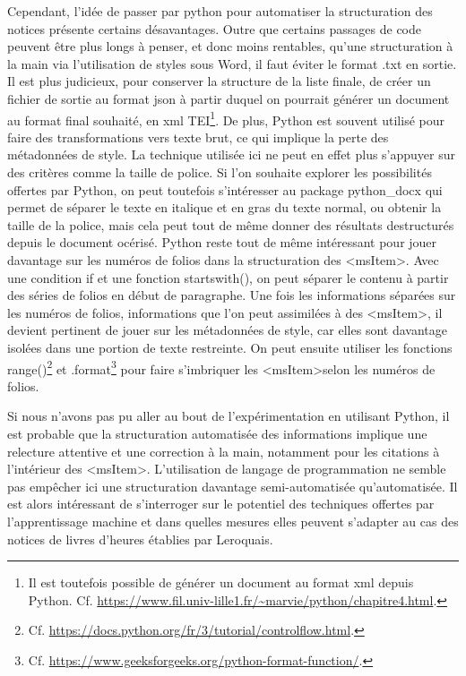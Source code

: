 \documentclass[a4paper,12pt,twoside]{book}
\begin{document}
Cependant, l'idée de passer par python pour automatiser la structuration des notices présente certains désavantages. Outre que certains passages de code peuvent être plus longs à penser, et donc moins rentables, qu'une structuration à la main via l'utilisation de styles sous Word, il faut éviter le format .txt en sortie. Il est plus judicieux, pour conserver la structure de la liste finale, de créer un fichier de sortie au format json à partir duquel on pourrait générer un document au format final souhaité, en xml TEI\footnote{Il est toutefois possible de générer un document au format xml depuis Python. Cf. \url{https://www.fil.univ-lille1.fr/~marvie/python/chapitre4.html}.}. De plus, Python est souvent utilisé pour faire des transformations vers texte brut, ce qui implique la perte des métadonnées de style. La technique utilisée ici ne peut en effet plus s'appuyer sur des critères comme la taille de police. Si l'on souhaite explorer les possibilités offertes par Python, on peut toutefois s'intéresser au package python\_docx qui permet de séparer le texte en italique et en gras du texte normal, ou obtenir la taille de la police, mais cela peut tout de même donner des résultats destructurés depuis le document océrisé. 
Python reste tout de même intéressant pour jouer davantage sur les numéros de folios dans la structuration des \textless msItem\textgreater . Avec une condition \og if\fg{} et une fonction startswith(), on peut séparer le contenu à partir des séries de folios en début de paragraphe. Une fois les informations séparées sur les numéros de folios, informations que l'on peut assimilées à des \textless msItem\textgreater , il devient pertinent de jouer sur les métadonnées de style, car elles sont davantage isolées dans une portion de texte restreinte. On peut ensuite utiliser les fonctions range()\footnote{Cf. \url{https://docs.python.org/fr/3/tutorial/controlflow.html}.} et .format{}\footnote{Cf. \url{https://www.geeksforgeeks.org/python-format-function/}.} pour faire s'imbriquer les \textless msItem\textgreater selon les numéros de folios. 

Si nous n'avons pas pu aller au bout de l'expérimentation en utilisant Python, il est probable que la structuration automatisée des informations implique une relecture attentive et une correction à la main, notamment pour les citations à l'intérieur des \textless msItem\textgreater . L'utilisation de langage de programmation ne semble pas empêcher ici une structuration davantage semi-automatisée qu'automatisée. Il est alors intéressant de s'interroger sur le potentiel des techniques offertes par l'apprentissage machine et dans quelles mesures elles peuvent s'adapter au cas des notices de livres d'heures établies par Leroquais. 
	
\end{document}
